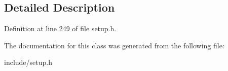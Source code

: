 \subsection{Detailed Description}


Definition at line 249 of file setup.\-h.



The documentation for this class was generated from the following file\-:\begin{DoxyCompactItemize}
\item 
include/setup.\-h\end{DoxyCompactItemize}
